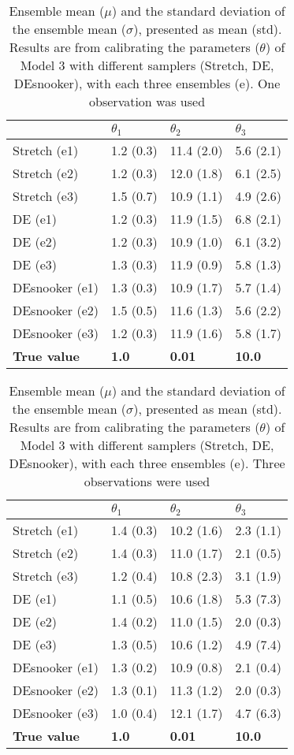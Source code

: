 \begin{table}[ht]
\caption{Ensemble mean ($\mu$) and the standard deviation of the ensemble mean ($\sigma$), presented as mean (std). Results are from calibrating the parameters ($\theta$) of Model 3 with different samplers (Stretch, DE, DEsnooker), with each three ensembles (e). One observation was used}
\label{tab_logbook8_obs1_model3}
\begin{tabularx}{\textwidth}{XXXX}
\toprule
 & $\theta_1$ & $\theta_2$ & $\theta_3$\\
\midrule
Stretch (e1) & 1.2 (0.3) & 11.4 (2.0) & 5.6 (2.1) \\
Stretch (e2) & 1.2 (0.3) & 12.0 (1.8) & 6.1 (2.5) \\
Stretch (e3) & 1.5 (0.7) & 10.9 (1.1) & 4.9 (2.6) \\
\midrule
DE (e1) & 1.2 (0.3) & 11.9 (1.5) & 6.8 (2.1) \\
DE (e2) & 1.2 (0.3) & 10.9 (1.0) & 6.1 (3.2) \\
DE (e3) & 1.3 (0.3) & 11.9 (0.9) & 5.8 (1.3) \\
\midrule
DEsnooker (e1) & 1.3 (0.3) & 10.9 (1.7) & 5.7 (1.4) \\
DEsnooker (e2) & 1.5 (0.5) & 11.6 (1.3) & 5.6 (2.2) \\
DEsnooker (e3) & 1.2 (0.3) & 11.9 (1.6) & 5.8 (1.7) \\
\midrule
\textbf{True value} & \textbf{1.0} & \textbf{0.01} &\textbf{10.0} \\
\bottomrule
\end{tabularx}
\end{table}

\begin{table}[ht]
\caption{Ensemble mean ($\mu$) and the standard deviation of the ensemble mean ($\sigma$), presented as mean (std). Results are from calibrating the parameters ($\theta$) of Model 3 with different samplers (Stretch, DE, DEsnooker), with each three ensembles (e). Three observations were used}
\label{tab_logbook8_obs3_model3}
\begin{tabularx}{\textwidth}{XXXX}
\toprule
 & $\theta_1$ & $\theta_2$ & $\theta_3$\\
\midrule
Stretch (e1) & 1.4 (0.3) & 10.2 (1.6) & 2.3 (1.1) \\
Stretch (e2) & 1.4 (0.3) & 11.0 (1.7) & 2.1 (0.5) \\
Stretch (e3) & 1.2 (0.4) & 10.8 (2.3) & 3.1 (1.9) \\
\midrule
DE (e1) & 1.1 (0.5) & 10.6 (1.8) & 5.3 (7.3) \\
DE (e2) & 1.4 (0.2) & 11.0 (1.5) & 2.0 (0.3) \\
DE (e3) & 1.3 (0.5) & 10.6 (1.2) & 4.9 (7.4) \\
\midrule
DEsnooker (e1) & 1.3 (0.2) & 10.9 (0.8) & 2.1 (0.4) \\
DEsnooker (e2) & 1.3 (0.1) & 11.3 (1.2) & 2.0 (0.3) \\
DEsnooker (e3) & 1.0 (0.4) & 12.1 (1.7) & 4.7 (6.3) \\
\midrule
\textbf{True value} & \textbf{1.0} & \textbf{0.01} &\textbf{10.0} \\
\bottomrule
\end{tabularx}
\end{table}


